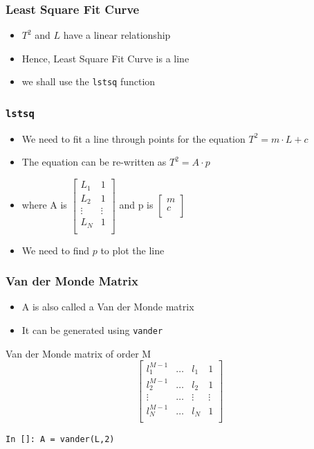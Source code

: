 \documentclass[14pt,compress]{beamer}
\newcommand{\typ}[1]{\lstinline{#1}}
\begin{document}
\begin{frame}
\frametitle{Least Square Fit Curve}
\begin{itemize}
\item $T^2$ and $L$ have a linear relationship
\item Hence, Least Square Fit Curve is a line
\item we shall use the \typ{lstsq} function
\end{itemize}
\end{frame}

\begin{frame}[fragile]
\frametitle{\typ{lstsq}}
\begin{itemize}
\item We need to fit a line through points for the equation $T^2 = m \cdot L+c$
\item The equation can be re-written as $T^2 = A \cdot p$
\item where A is   
  $\begin{bmatrix}
  L_1 & 1 \\
  L_2 & 1 \\
  \vdots & \vdots\\
  L_N & 1 \\
  \end{bmatrix}$
  and p is 
  $\begin{bmatrix}
  m\\
  c\\
  \end{bmatrix}$
\item We need to find $p$ to plot the line
\end{itemize}
\end{frame}

\begin{frame}[fragile]
\frametitle{Van der Monde Matrix}
\begin{itemize}
\item A is also called a Van der Monde matrix
\item It can be generated using \typ{vander}
\end{itemize}
Van der Monde matrix of order M
\begin{equation*}
  \begin{bmatrix}
  l_1^{M-1} & \ldots & l_1 & 1 \\
  l_2^{M-1} & \ldots &l_2 & 1 \\
  \vdots & \ldots & \vdots & \vdots\\
  l_N^{M-1} & \ldots & l_N & 1 \\
  \end{bmatrix}
\end{equation*}
\begin{lstlisting}
In []: A = vander(L,2)
\end{lstlisting}
\end{frame}
\end{document}
